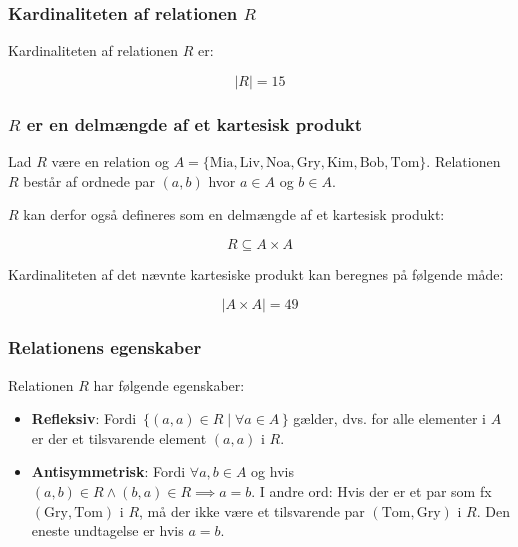 \subsubsection{Kardinaliteten af relationen \(R\)}

Kardinaliteten af relationen \(R\) er:

\begin{equation}
    |R| = 15\label{eq:equation5}
\end{equation}

\subsubsection{\(R\) er en delmængde af et kartesisk produkt}

Lad \(R\) være en relation og \(A = \{\text{Mia}, \text{Liv}, \text{Noa}, \text{Gry}, \text{Kim}, \text{Bob},
\text{Tom}\}\).
Relationen \(R\) består af ordnede par \((a, b)\) hvor \(a \in A\) og \(b \in A\).

\(R\) kan derfor også defineres som en delmængde af et kartesisk produkt:

\begin{equation}
    R \subseteq A \times A\label{eq:equation3}
\end{equation}

Kardinaliteten af det nævnte kartesiske produkt kan beregnes på følgende måde:

\begin{equation}
    | A \times A | = 49\label{eq:equation4}
\end{equation}

\subsubsection{Relationens egenskaber}

Relationen \(R\) har følgende egenskaber:

\begin{itemize}
    \item \textbf{Refleksiv}: Fordi \(\,\{(a, a) \in R \mid \forall a \in A\,\}\) gælder, dvs.
    for alle elementer i \(A\) er der et tilsvarende element \((a, a)\) i \(R\).
    \item \textbf{Antisymmetrisk}: Fordi \(\forall a, b \in A \) og hvis
    \((a, b) \in R \land (b, a) \in R \implies a = b\).
    I andre ord: Hvis der er et par som fx \((\text{Gry}, \text{Tom})\) i \(R\), må der ikke være et tilsvarende par
    \((\text{Tom}, \text{Gry})\) i \(R\).
    Den eneste undtagelse er hvis \(a = b\).
\end{itemize}

